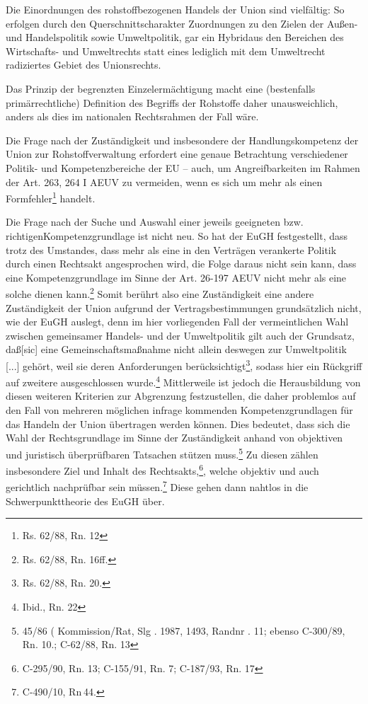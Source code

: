 \documentclass[12pt,a4paper,oneside]{book} %
\begin{document}
Die Einordnungen des rohstoffbezogenen Handels der Union sind vielfältig: So erfolgen durch den Querschnittscharakter Zuordnungen zu den Zielen der Außen- und Handelspolitik sowie Umweltpolitik\autocite[7]{Kueblboeck_2023}, gar ein \glqq Hybrid\grqq aus den Bereichen des Wirtschafts- und Umweltrechts statt eines lediglich mit dem Umweltrecht \glqq radiziertes Gebiet des Unionsrechts\grqq.\autocite{terhechte_konoslidierung_emergenz_2015}

Das Prinzip der begrenzten Einzelermächtigung macht eine (bestenfalls primärrechtliche) Definition des Begriffs der Rohstoffe daher unausweichlich, anders als dies im nationalen Rechtsrahmen der Fall wäre.
	
Die Frage nach der Zuständigkeit und insbesondere der Handlungskompetenz der Union zur Rohstoffverwaltung erfordert eine genaue Betrachtung verschiedener Politik- und Kompetenzbereiche der EU -- auch, um Angreifbarkeiten im Rahmen der Art. 263, 264 I AEUV zu vermeiden, wenn es sich um mehr als einen \glqq Formfehler\grqq\footnote{Rs. 62/88, Rn. 12} handelt.
	
Die Frage nach der Suche und Auswahl einer jeweils geeigneten bzw. \glqq richtigen\grqq Kompetenzgrundlage ist nicht neu. So hat der EuGH festgestellt, dass trotz des Umstandes, dass mehr als eine in den Verträgen verankerte Politik durch einen Rechtsakt angesprochen wird, die Folge daraus nicht sein kann, dass eine Kompetenzgrundlage im Sinne der Art. 26-197 AEUV nicht mehr als eine solche dienen kann.\footnote{Rs. 62/88, Rn. 16ff.} Somit berührt also eine Zuständigkeit eine andere Zuständigkeit der Union aufgrund der Vertragsbestimmungen grundsätzlich nicht, wie der EuGH auslegt, denn im hier vorliegenden Fall der vermeintlichen Wahl zwischen gemeinsamer Handels- und der Umweltpolitik gilt auch der Grundsatz, \glqq daß[sic] eine Gemeinschaftsmaßnahme nicht allein deswegen zur Umweltpolitik [...] gehört, weil sie deren Anforderungen berücksichtigt\grqq\footnote{Rs. 62/88, Rn. 20.}, sodass hier ein Rückgriff auf zweitere ausgeschlossen wurde.\footnote{Ibid., Rn. 22} Mittlerweile ist jedoch die Herausbildung von diesen weiteren Kriterien zur Abgrenzung festzustellen, die daher problemlos auf den Fall von mehreren möglichen infrage kommenden Kompetenzgrundlagen für das Handeln der Union übertragen werden können.\autocite{Callies, Berliner Beiträge Nr. 117, S. 11.} Dies bedeutet, dass sich die Wahl der Rechtsgrundlage im Sinne der Zuständigkeit anhand von objektiven und juristisch überprüfbaren Tatsachen stützen muss.\footnote{45/86 ( Kommission/Rat, Slg . 1987, 1493, Randnr . 11; ebenso C-300/89, Rn. 10.; C-62/88, Rn. 13} Zu diesen zählen insbesondere Ziel und Inhalt des Rechtsakts,\footnote{C-295/90, Rn. 13; C-155/91, Rn. 7; C-187/93, Rn. 17}, welche objektiv und auch gerichtlich nachprüfbar sein müssen.\footnote{C-490/10, Rn 44.} Diese gehen dann nahtlos in die Schwerpunkttheorie des EuGH über.\autocite[Ausführlich zu Kompetenzarten und -grundlagen]{Groeben, von der/Schwarze/Walter Obwexer, 7. Aufl. 2015, AEUV Art. 2 Rn. 51}
	
\end{document}

